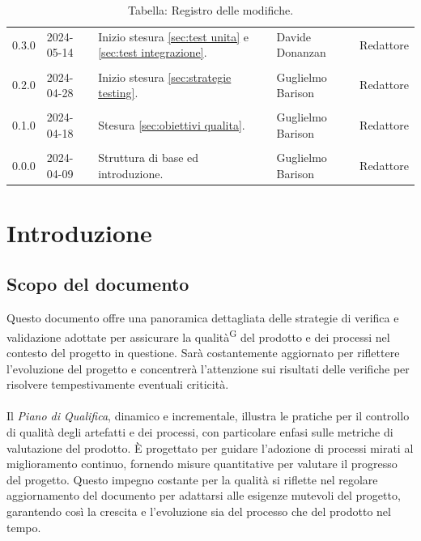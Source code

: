\documentclass[8pt]{article}
\newcommand{\glossterm}[1]{#1\textsuperscript{G}} %
\begin{document}
\begin{table}[ht!]
\begin{tabular}{p{1.2cm} p{2cm} p{6cm} p{3cm} p{2cm}}
		0.3.0 & 2024-05-14 & Inizio stesura \ref{sec:test unita} e \ref{sec:test integrazione}. & Davide Donanzan & Redattore \\\\
		0.2.0 & 2024-04-28 & Inizio stesura \ref{sec:strategie testing}. & Guglielmo Barison & Redattore \\\\
		0.1.0 & 2024-04-18 & Stesura \ref{sec:obiettivi qualita}. & Guglielmo Barison & Redattore \\\\
		0.0.0 & 2024-04-09 & Struttura di base ed introduzione.  & Guglielmo Barison & Redattore \\
		\bottomrule
	\end{tabular}
	\caption*{Tabella: Registro delle modifiche.}
	\label{table:Registro delle modifiche}
\end{table}
\newpage
\tableofcontents
\newpage
\listoffigures
\newpage
\listoftables
\newpage
\justifying
\section{Introduzione}
\subsection{Scopo del documento}
Questo documento offre una panoramica dettagliata delle strategie di verifica e validazione adottate per assicurare la \glossterm{qualità} del prodotto e dei processi nel contesto del progetto in questione. Sarà costantemente aggiornato per riflettere l'evoluzione del progetto e concentrerà l'attenzione sui risultati delle verifiche per risolvere tempestivamente eventuali criticità.
\\\\
Il \textit{Piano di Qualifica}, dinamico e incrementale, illustra le pratiche per il controllo di qualità degli artefatti e dei processi, con particolare enfasi sulle metriche di valutazione del prodotto. È progettato per guidare l'adozione di processi mirati al miglioramento continuo, fornendo misure quantitative per valutare il progresso del progetto. Questo impegno costante per la qualità si riflette nel regolare aggiornamento del documento per adattarsi alle esigenze mutevoli del progetto, garantendo così la crescita e l'evoluzione sia del processo che del prodotto nel tempo.
\end{document}
